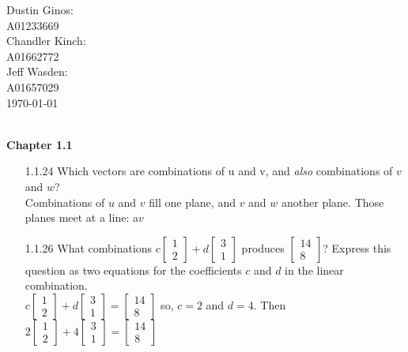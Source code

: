 \documentclass[10pt,twoside,reqno]{article}
\begin{document}
\begin{flushright}
\begin{minipage}{.25\textwidth}
Dustin Ginos: \\
A01233669\\
Chandler Kinch: \\
A01662772\\
Jeff Wasden: \\
A01657029\\

\today
\end{minipage}
\end{flushright}

\\
\vspace{5mm}
\textbf{Chapter 1.1}
\begin{enumerate}
\item[1.1.24] Which vectors are combinations of u and v, and \textit{also} combinations of $v$ and $w$? \\
\vspace{3mm}
Combinations of $u$ and $v$ fill one plane, and $v$ and $w$ another plane. Those planes meet at a line: a$v$
\item[1.1.26] What combinations $c \left[\begin{smallmatrix} 1\\ 2 \end{smallmatrix} \right] + d\left[\begin{smallmatrix} 3\\ 1 \end{smallmatrix} \right]$ produces $ \left[\begin{smallmatrix} 14\\ 8 \end{smallmatrix} \right]$? Express this question as two equations for the coefficients $c$ and $d$ in the linear combination.\\
\vspace{3mm}
$c \left[\begin{smallmatrix} 1\\ 2 \end{smallmatrix} \right] + d\left[\begin{smallmatrix} 3\\ 1 \end{smallmatrix} \right] = \left[\begin{smallmatrix} 14\\ 8 \end{smallmatrix} \right]$ so, $c= 2$ and $d = 4$. Then $2 \left[\begin{smallmatrix} 1\\ 2 \end{smallmatrix} \right] + 4\left[\begin{smallmatrix} 3\\ 1 \end{smallmatrix} \right] = \left[\begin{smallmatrix} 14\\ 8 \end{smallmatrix} \right]$

\end{enumerate}
\end{document}
